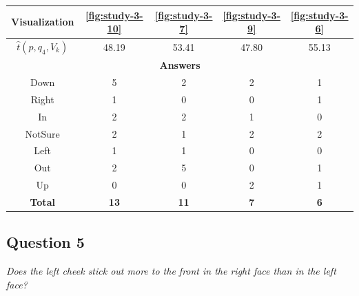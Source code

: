 \begin{center}
\begin{tabular}{| c | c | c | c | c |}
	\hline
	Visualization & \ref{fig:study-3-10} & \ref{fig:study-3-7} & \ref{fig:study-3-9} & \ref{fig:study-3-6}\\ \hline
	\(\widehat{t}(p, q_4, V_k)\) & 48.19 & 53.41 & 47.80 & 55.13\\ \hline
	\multicolumn{5}{|c|}{\bf Answers} \\ \hline
	\rowcolor{yellow!30} Down & 5 & 2 & 2 & 1\\ \hline
	Right & 1 & 0 & 0 & 1\\ \hline
	In & 2 & 2 & 1 & 0\\ \hline
	NotSure & 2 & 1 & 2 & 2\\ \hline
	Left & 1 & 1 & 0 & 0\\ \hline
	Out & 2 & 5 & 0 & 1\\ \hline
	Up & 0 & 0 & 2 & 1\\ \hline
	{\bf Total} & {\bf 13} & {\bf 11} & {\bf 7} & {\bf 6}\\ \hline
\end{tabular}
\end{center}
\clearpage

\subsection{Question 5}
\label{attch:complete_study_results-question5}

\begin{center}{\it Does the left cheek stick out more to the front in the right face than in the left face?}\end{center}

